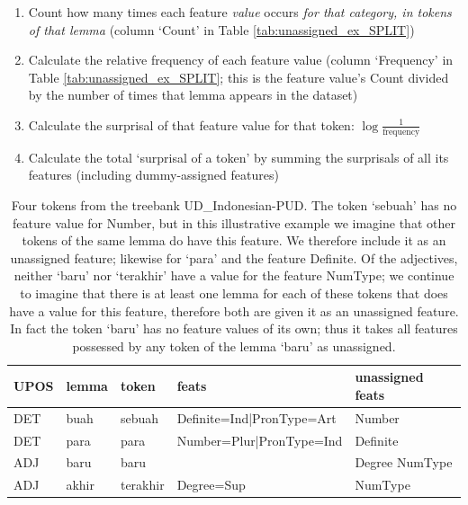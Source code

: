 \documentclass[USenglish]{article}
\begin{document}
\begin{enumerate}
\item Count how many times each feature \textit{value} occurs \textit{for that category, in tokens of that lemma} (column `Count' in Table \ref{tab:unassigned_ex_SPLIT})
\item Calculate the relative frequency of each feature value (column `Frequency' in Table \ref{tab:unassigned_ex_SPLIT}; this is the feature value's Count divided by the number of times that lemma appears in the dataset)
\item Calculate the surprisal of that feature value for that token: $\log{\frac{1}{\text{frequency}}}$
\item Calculate the total `surprisal of a token' by summing the surprisals of all its features (including dummy-assigned features)
\end{enumerate}


\begin{table}[h]
    \centering
    \caption{Four tokens from the treebank UD\_Indonesian-PUD. The token `sebuah' has no feature value for Number, but in this illustrative example we imagine that other tokens of the same lemma do have this feature. We therefore include it as an unassigned feature; likewise for `para' and the feature Definite. Of the adjectives, neither `baru' nor `terakhir' have a value for the feature NumType; we continue to imagine that there is at least one lemma for each of these tokens that does have a value for this feature, therefore both are given it as an unassigned feature. In fact the token `baru' has no feature values of its own; thus it takes all features possessed by any token of the lemma `baru' as unassigned.} %
    \label{tab:unassigned_ex}   
    \begin{tabular}{p{1cm}p{1.4cm}p{1.5cm}p{3.5cm}p{2.5cm}}
\toprule

UPOS&lemma	&token	&feats & unassigned feats	\\ 
\midrule
DET & buah & sebuah 
& Definite=Ind|PronType=Art
& Number
\\\midrule
DET & para	& para	&Number=Plur|PronType=Ind & Definite
\\\midrule
ADJ&baru	&baru&
& Degree \newline
NumType 
\\\midrule
ADJ & akhir	&terakhir&	Degree=Sup& NumType\\\bottomrule
\end{tabular}
\end{table}
\end{document}
